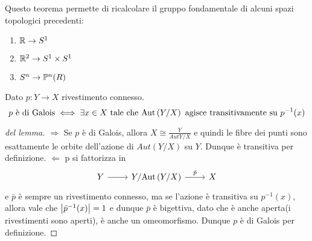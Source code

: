 \documentclass[]{article}
\begin{document}
\begin{remark} \nl
    Questo teorema permette di ricalcolare il gruppo fondamentale di alcuni spazi topologici precedenti:
    \begin{enumerate}
        \item $\R \to \Sph{1}$ \nl
        \item $\R^2 \to \Sph{1} \times \Sph{1}$ \nl
        \item $\Sph{n} \to \Proj{R}{n}$
    \end{enumerate}
\end{remark}

\begin{lemma}  \nl
    Dato $p: Y \to X$ rivestimento connesso. \nl
    \[
        p \text{ \`e di Galois} \iff \exists x \in X \tc \Aut{Y/X} \text{ agisce transitivamente su } p^{-1}(x)
    \]
\end{lemma}

\begin{proof} [del lemma]\nl
    $\Rightarrow$ Se $p$ \`e di Galois, allora $X \cong \frac{Y}{Aut{Y/X}}$ e quindi le fibre dei punti
    sono esattamente le orbite dell'azione di $Aut{(Y/X)}$ su $Y$. Dunque \`e transitiva per definizione. \nl
    $\Leftarrow$ p si fattorizza in
    \[\begin{tikzcd}
    Y & {Y/\Aut{Y/X}} & X
    \arrow["", from=1-1, to=1-2]
    \arrow["{\bar{p}}", from=1-2, to=1-3]
    \end{tikzcd}\]
    e $\bar{p}$ \`e sempre un rivestimento connesso, ma se l'azione \`e transitiva su $p^{-1}(x)$, allora
    vale che $\abs{\bar{p}^{-1}(x)} = 1$ e dunque $\bar{p}$ \`e bigettiva, dato che \`e anche aperta(i rivestimenti sono aperti), \`e anche un omeomorfismo. \nl
    Dunque $p$ \`e di Galois per definizione.
\end{proof}
\end{document}

